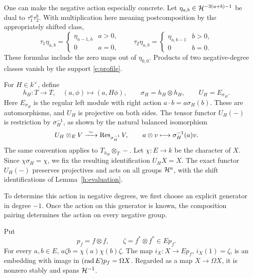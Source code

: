 One can make the negative action especially concrete.  Let
\(\eta_{a,b}\in\mathcal H^{-3(a+b)-1}\) be dual to
\(\tau_1^a\tau_2^b\).  With multiplication here meaning
postcomposition by the appropriately shifted class,
\begin{equation}
\tau_1\eta_{a,b}=
 \begin{cases}\eta_{a-1,b}&a>0,\\0&a=0,\end{cases}
\qquad
\tau_2\eta_{a,b}=
 \begin{cases}\eta_{a,b-1}&b>0,\\0&b=0.\end{cases}
\label{e:negative-action}
\end{equation}
These formulas include the zero maps out of \(\eta_{0,0}\).
Products of two negative-degree classes vanish by the support
\eqref{e:profile}.

For \(H\in k^\times\), define
\begin{equation}
h_H:T\longrightarrow T,\quad (a,\phi)\longmapsto(a,H\phi),
\qquad \sigma_H=h_H\otimes h_H,
\qquad U_H=E_{\sigma_H}.
\label{e:twist-definition}
\end{equation}
Here \(E_{\sigma_H}\) is the regular left module with right action
\(a\cdot b=a\sigma_H(b)\).  These are automorphisms, and \(U_H\)
is projective on both sides.  The tensor functor \(U_H(-)\) is
restriction by \(\sigma_H^{-1}\), as shown by the natural balanced
isomorphism
\begin{equation}
U_H\otimes_E V\xrightarrow{\ \sim\ }
\operatorname{Res}_{\sigma_H^{-1}}V,\qquad
a\otimes v\longmapsto\sigma_H^{-1}(a)v.
\label{e:inverse-restriction}
\end{equation}
The same convention applies to \(T_{h_H}\otimes_T-\).
Let \(\chi:E\to k\) be the character of \(X\).  Since
\(\chi\sigma_H=\chi\), we fix the resulting identification
\(U_H X=X\).  The exact functor \(U_H(-)\) preserves projectives
and acts on all groups \(\mathcal H^a\), with the shift identifications of
Lemma~\ref{h:evaluation}.

To determine this action in negative degrees, we first choose an
explicit generator in degree \(-1\). Once the action on this generator
is known, the composition pairing determines the action on every
negative group.

\begin{lemma}\label{e:socle}
Put
\[
p_f=f\otimes f,\qquad \zeta=f^*\otimes f^*\in E p_f.
\]
For every \(a,b\in E\),
\(a\zeta b=\chi(a)\chi(b)\zeta\).
The map \(i_X:X\to Ep_f\), \(i_X(1)=\zeta\), is an embedding with
image in \((\operatorname{rad} E)p_f=\Omega X\).  Regarded as a map
\(X\to\Omega X\), it is nonzero stably and spans \(\mathcal H^{-1}\).
\end{lemma}

